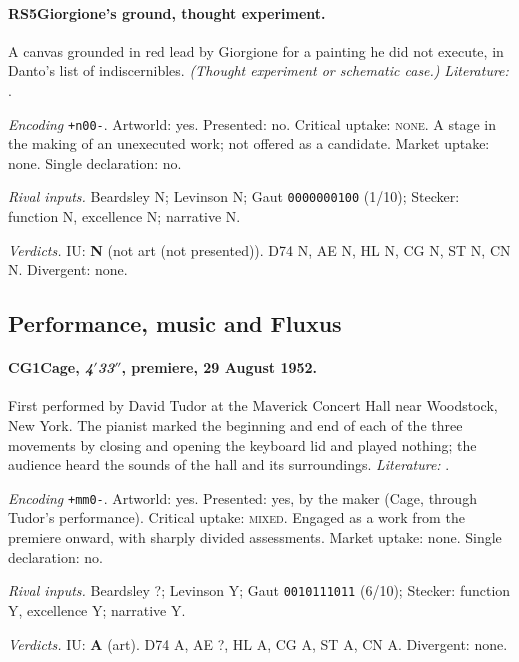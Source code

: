 \paragraph{RS5\enspace Giorgione's ground, thought experiment.}
A canvas grounded in red lead by Giorgione for a painting he did not execute, in Danto's list of indiscernibles. \textit{(Thought experiment or schematic case.)} \textit{Literature:} \citet{Danto1981}.\par
\noindent\textit{Encoding} \texttt{+n00-}. Artworld: yes. Presented: no. Critical uptake: \textsc{none}. A stage in the making of an unexecuted work; not offered as a candidate. Market uptake: none. Single declaration: no.\par
\noindent\textit{Rival inputs.} Beardsley N; Levinson N; Gaut \texttt{0000000100} (1/10); Stecker: function N, excellence N; narrative N.\par
\noindent\textit{Verdicts.} IU: \textbf{N} (not art (not presented)). D74 N, AE N, HL N, CG N, ST N, CN N. Divergent: none.\par

\subsection{Performance, music and Fluxus}

\paragraph{CG1\enspace Cage, \emph{4$'$33$''$}, premiere, 29 August 1952.}
First performed by David Tudor at the Maverick Concert Hall near Woodstock, New York. The pianist marked the beginning and end of each of the three movements by closing and opening the keyboard lid and played nothing; the audience heard the sounds of the hall and its surroundings. \textit{Literature:} \citet{Cage1961}.\par
\noindent\textit{Encoding} \texttt{+mm0-}. Artworld: yes. Presented: yes, by the maker (Cage, through Tudor's performance). Critical uptake: \textsc{mixed}. Engaged as a work from the premiere onward, with sharply divided assessments. Market uptake: none. Single declaration: no.\par
\noindent\textit{Rival inputs.} Beardsley ?; Levinson Y; Gaut \texttt{0010111011} (6/10); Stecker: function Y, excellence Y; narrative Y.\par
\noindent\textit{Verdicts.} IU: \textbf{A} (art). D74 A, AE ?, HL A, CG A, ST A, CN A. Divergent: none.\par

